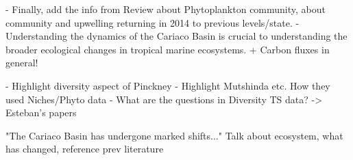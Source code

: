 \documentclass[draft]{agujournal2019}
\begin{document}
    
    - Finally, add the info from Review about Phytoplankton community, about community and upwelling returning in 2014 to previous levels/state.
    - Understanding the dynamics of the Cariaco Basin is crucial to understanding the broader ecological changes in tropical marine ecosystems. + Carbon fluxes in general!

    - Highlight diversity aspect of Pinckney
    - Highlight Mutshinda etc. How they used Niches/Phyto data
    - What are the questions in Diversity TS data? -> Esteban's papers
   

    
    
    "The Cariaco Basin has undergone marked shifts..." Talk about ecosystem, what has changed, reference prev literature
\end{document}
